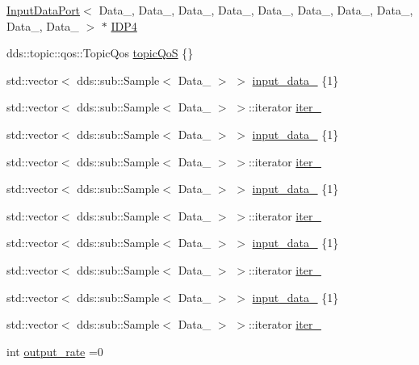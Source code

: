 \begin{DoxyCompactItemize}
\hyperlink{classInputDataPort}{Input\+Data\+Port}$<$ Data\+\_, Data\+\_, Data\+\_, Data\+\_, Data\+\_, Data\+\_, Data\+\_, Data\+\_, Data\+\_, Data\+\_ $>$ $\ast$ \hyperlink{classProcessingBlock_a4253011fab5d88efa3653bc2cba4e877}{I\+D\+P4}
\item 
dds\+::topic\+::qos\+::\+Topic\+Qos \hyperlink{classProcessingBlock_a0834476a4eb459338d9ca2ab2ef1d540}{topic\+QoS} \{\}
\item 
std\+::vector$<$ dds\+::sub\+::\+Sample$<$ Data\+\_ $>$ $>$ \hyperlink{classProcessingBlock_a6cfd229eb541713b280ce3974353371e}{input\+\_\+data\+\_} \{1\}
\item 
std\+::vector$<$ dds\+::sub\+::\+Sample$<$ Data\+\_ $>$ $>$\+::iterator \hyperlink{classProcessingBlock_a397865ace617730af3b9e0bdf73e2d03}{iter\+\_}
\item 
std\+::vector$<$ dds\+::sub\+::\+Sample$<$ Data\+\_ $>$ $>$ \hyperlink{classProcessingBlock_a51dcc687a3cb48a3180b16e2d73aacef}{input\+\_\+data\+\_} \{1\}
\item 
std\+::vector$<$ dds\+::sub\+::\+Sample$<$ Data\+\_ $>$ $>$\+::iterator \hyperlink{classProcessingBlock_a3ccac18e84f70c0bc7fd95b025b38b99}{iter\+\_}
\item 
std\+::vector$<$ dds\+::sub\+::\+Sample$<$ Data\+\_ $>$ $>$ \hyperlink{classProcessingBlock_a48ced0c460950030700280d39ae4f288}{input\+\_\+data\+\_} \{1\}
\item 
std\+::vector$<$ dds\+::sub\+::\+Sample$<$ Data\+\_ $>$ $>$\+::iterator \hyperlink{classProcessingBlock_abc7c99fdfa686a7c06f19097e464cf31}{iter\+\_}
\item 
std\+::vector$<$ dds\+::sub\+::\+Sample$<$ Data\+\_ $>$ $>$ \hyperlink{classProcessingBlock_afe0127dd1f86dcc453e1af24452dfd17}{input\+\_\+data\+\_} \{1\}
\item 
std\+::vector$<$ dds\+::sub\+::\+Sample$<$ Data\+\_ $>$ $>$\+::iterator \hyperlink{classProcessingBlock_abce6ed2b33607842fdcabab95b2426bb}{iter\+\_}
\item 
std\+::vector$<$ dds\+::sub\+::\+Sample$<$ Data\+\_ $>$ $>$ \hyperlink{classProcessingBlock_acc5d832504804bcbe6e2341cfec61a6e}{input\+\_\+data\+\_} \{1\}
\item 
std\+::vector$<$ dds\+::sub\+::\+Sample$<$ Data\+\_ $>$ $>$\+::iterator \hyperlink{classProcessingBlock_a6d4b5058373e350d7b7329010fe55f40}{iter\+\_}
\item 
int \hyperlink{classProcessingBlock_a58e03ff6647a5e2aa7fa96ff74652ed8}{output\+\_\+rate} =0
\end{DoxyCompactItemize}
